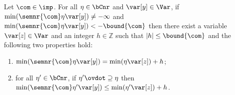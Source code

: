 \begin{lemma}\label{le:decnr}
  Let \(\com\in \imp\).
  For all \(\eta \in \bCnr\) and \(\var[y] \in \Var\), if
  \(\min(\semnr{\com} \eta \var[y]) \neq -\infty\) and
  \(\min(\semnr{\com}\eta \var[y]) < -\bound{\com}\) then there exist a
  variable \(\var[z] \in \Var\) and an integer \(h \in \mathbb{Z}\)
  such that \(|h| \leq \bound{\com}\) and the following two properties
  hold:
  \begin{enumerate}[label=(\roman*)]
  \item\label{point1nrmin} \(\min(\semnr{\com}\eta \var[y]) = \min(\eta \var[z]) + h\); 
  \item\label{point2nrmin} for all \(\eta' \in \bCnr\), if
    \(\eta' \ovdot\supseteq \eta\)
    then
    \(\min(\semnr{\com}\eta' \var[y]) \leq \min(\eta' \var[z]) + h\).
  \end{enumerate}
\end{lemma}
